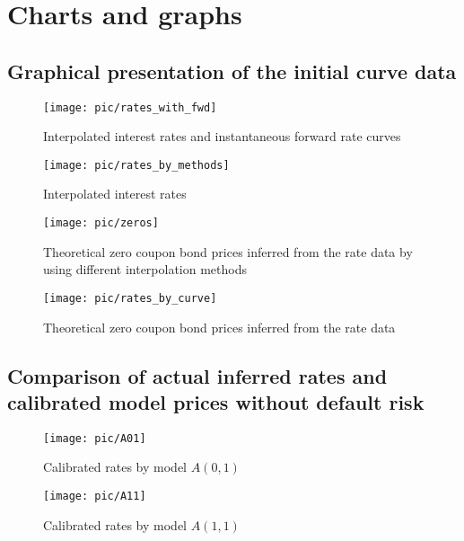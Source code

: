 \chapter{Charts and graphs}
\label{chap:charts}

\pagebreak

\section{Graphical presentation of the initial curve data}

\begin{figure}[H]
	\centering
	\texttt{[image: pic/rates\_with\_fwd]}
	\caption{Interpolated interest rates and instantaneous forward rate curves}
	\label{fig:rateswithfwd}
\end{figure}

\begin{figure}[H]
	\centering
	\texttt{[image: pic/rates\_by\_methods]}
	\caption{Interpolated interest rates}
	\label{fig:ratesbymethods}
\end{figure}

\begin{figure}[H]
	\centering
	\texttt{[image: pic/zeros]}
	\caption{Theoretical zero coupon bond prices inferred from the rate data by using different interpolation methods}
	\label{fig:zeros}
\end{figure}

\begin{figure}[H]
	\centering
	\texttt{[image: pic/rates\_by\_curve]}
	\caption{Theoretical zero coupon bond prices inferred from the rate data}
	\label{fig:ratesbycurve}
\end{figure}

\section{Comparison of actual inferred rates and calibrated model prices without default risk}

\begin{figure}[H]
	\centering
	\texttt{[image: pic/A01]}
	\caption{Calibrated rates by model $A(0,1)$}
	\label{fig:A01}
\end{figure}

\begin{figure}[H]
	\centering
	\texttt{[image: pic/A11]}
	\caption{Calibrated rates by model $A(1,1)$}
	\label{fig:A11}
\end{figure}

